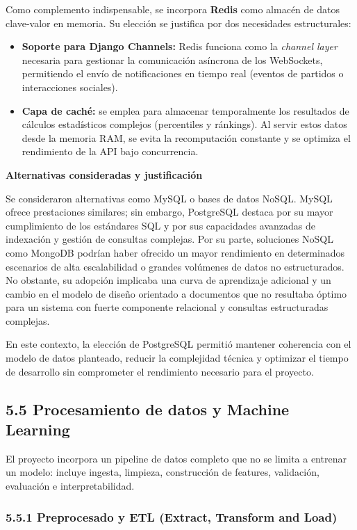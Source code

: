 Como complemento indispensable, se incorpora \textbf{Redis} como almacén de datos clave-valor en memoria. Su elección se justifica por dos necesidades estructurales:
\begin{itemize}
    \item \textbf{Soporte para Django Channels:} Redis funciona como la \textit{channel layer} necesaria para gestionar la comunicación asíncrona de los WebSockets, permitiendo el envío de notificaciones en tiempo real (eventos de partidos o interacciones sociales).
    \item \textbf{Capa de caché:} se emplea para almacenar temporalmente los resultados de cálculos estadísticos complejos (percentiles y ránkings). Al servir estos datos desde la memoria RAM, se evita la recomputación constante y se optimiza el rendimiento de la API bajo concurrencia.
\end{itemize}

\textbf{Alternativas consideradas y justificación}

Se consideraron alternativas como MySQL o bases de datos NoSQL. MySQL ofrece prestaciones similares; 
sin embargo, PostgreSQL destaca por su mayor cumplimiento de los estándares SQL y por sus capacidades 
avanzadas de indexación y gestión de consultas complejas. Por su parte, soluciones NoSQL como MongoDB 
podrían haber ofrecido un mayor rendimiento en determinados escenarios de alta escalabilidad o grandes 
volúmenes de datos no estructurados. No obstante, su adopción implicaba una curva de aprendizaje 
adicional y un cambio en el modelo de diseño orientado a documentos que no resultaba óptimo para un 
sistema con fuerte componente relacional y consultas estructuradas complejas.

En este contexto, la elección de PostgreSQL permitió mantener coherencia con el modelo de datos 
planteado, reducir la complejidad técnica y optimizar el tiempo de desarrollo sin comprometer el 
rendimiento necesario para el proyecto.

\subsection{5.5 Procesamiento de datos y Machine Learning}

El proyecto incorpora un pipeline de datos completo que no se limita a entrenar un modelo: incluye 
ingesta, limpieza, construcción de features, validación, evaluación e interpretabilidad.

\subsubsection{5.5.1 Preprocesado y ETL (Extract, Transform and Load)}

